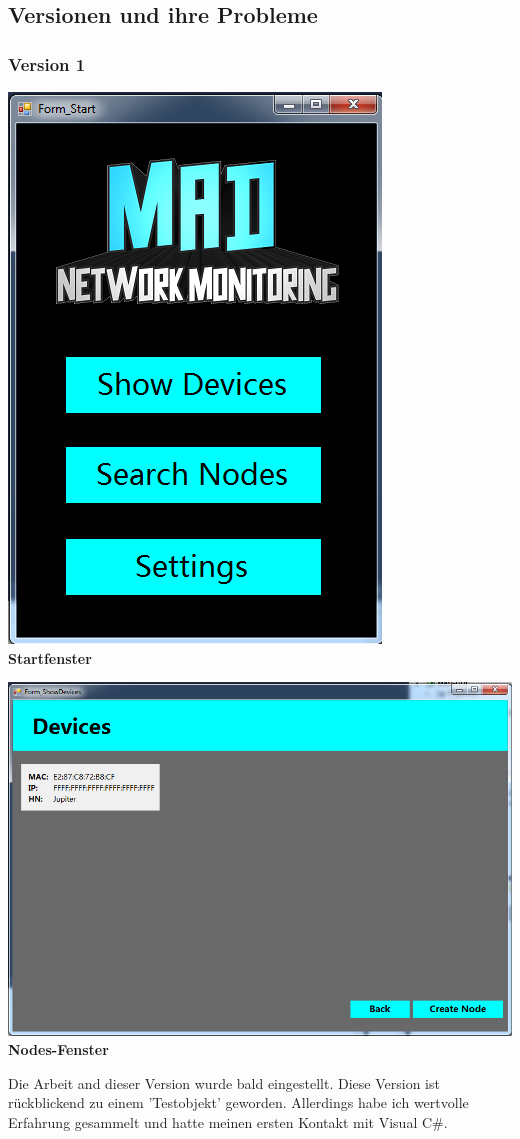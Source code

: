 \documentclass[12pt,a4paper]{report}
\begin{document}
\begin{onehalfspace}
\subsection{Versionen und ihre Probleme}
\subsubsection{Version 1}
\begin{center}
\includegraphics[scale=0.5]{../docs/lyaton/graphics/GUI_v1_start.png}\\
\textbf{Startfenster}
\end{center}
\begin{center}
\includegraphics[scale=0.5]{../docs/lyaton/graphics/GUI_v1_nodes.png}\\
\textbf{Nodes-Fenster}
\end{center}
Die Arbeit and dieser Version wurde bald eingestellt. Diese Version ist rückblickend zu einem 'Testobjekt' geworden. Allerdings habe ich wertvolle Erfahrung gesammelt und hatte meinen ersten Kontakt mit Visual C\#.

\end{onehalfspace}
\end{document}
